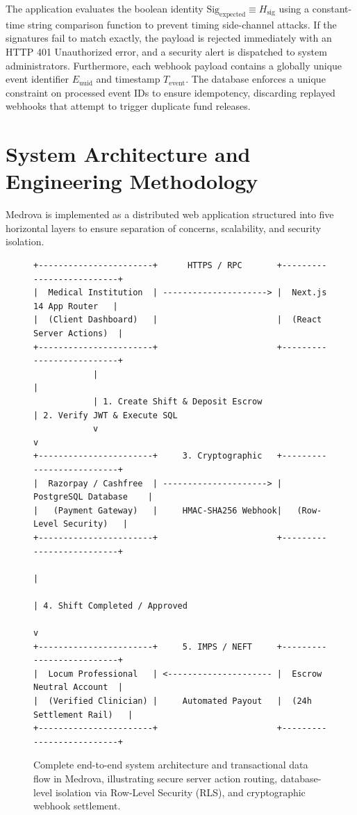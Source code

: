 \documentclass[conference]{IEEEtran}
\begin{document}
The application evaluates the boolean identity $\text{Sig}_{\text{expected}} \equiv H_{\text{sig}}$ using a constant-time string comparison function to prevent timing side-channel attacks. If the signatures fail to match exactly, the payload is rejected immediately with an HTTP 401 Unauthorized error, and a security alert is dispatched to system administrators. Furthermore, each webhook payload contains a globally unique event identifier $E_{\text{uuid}}$ and timestamp $T_{\text{event}}$. The database enforces a unique constraint on processed event IDs to ensure idempotency, discarding replayed webhooks that attempt to trigger duplicate fund releases.

\section{System Architecture and Engineering Methodology}
Medrova is implemented as a distributed web application structured into five horizontal layers to ensure separation of concerns, scalability, and security isolation.

\begin{figure}[t]
\begin{center}
\begingroup
\scriptsize
\begin{minipage}{0.95\textwidth}
\begin{verbatim}
+-----------------------+      HTTPS / RPC       +--------------------------+
|  Medical Institution  | ---------------------> |  Next.js 14 App Router   |
|  (Client Dashboard)   |                        |  (React Server Actions)  |
+-----------------------+                        +--------------------------+
            |                                                 |
            | 1. Create Shift & Deposit Escrow                | 2. Verify JWT & Execute SQL
            v                                                 v
+-----------------------+     3. Cryptographic   +--------------------------+
|  Razorpay / Cashfree  | ---------------------> |   PostgreSQL Database    |
|   (Payment Gateway)   |     HMAC-SHA256 Webhook|   (Row-Level Security)   |
+-----------------------+                        +--------------------------+
                                                              |
                                                              | 4. Shift Completed / Approved
                                                              v
+-----------------------+     5. IMPS / NEFT     +--------------------------+
|  Locum Professional   | <--------------------- |  Escrow Neutral Account  |
|  (Verified Clinician) |     Automated Payout   |  (24h Settlement Rail)   |
+-----------------------+                        +--------------------------+
\end{verbatim}
\end{minipage}
\endgroup
\caption{Complete end-to-end system architecture and transactional data flow in Medrova, illustrating secure server action routing, database-level isolation via Row-Level Security (RLS), and cryptographic webhook settlement.}
\label{fig:architecture_diagram}
\end{center}
\end{figure}
\end{document}
